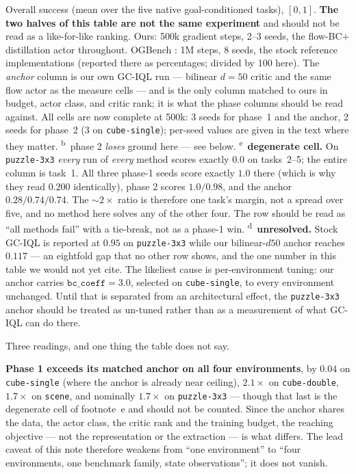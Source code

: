 \documentclass[10pt]{article}
\begin{document}
\begin{table}[h]
\vspace{3pt}
\raggedright\footnotesize
Overall success (mean over the five native goal-conditioned tasks), $[0,1]$.
\textbf{The two halves of this table are not the same experiment} and should not be read as
a like-for-like ranking.
Ours: 500k gradient steps, 2--3 seeds, the flow-BC$+$distillation actor throughout.
OGBench \citep{park2024ogbench}: 1M steps, 8 seeds, the stock reference implementations
(reported there as percentages; divided by 100 here).
The \emph{anchor} column is our own GC-IQL run --- bilinear $d{=}50$ critic and the same
flow actor as the measure cells --- and is the only column matched to ours in budget,
actor class, and critic rank; it is what the phase columns should be read against.
All cells are now complete at 500k: 3 seeds for phase~1 and the anchor, 2 seeds for
phase~2 (3 on \texttt{cube-single}); per-seed values are given in the text where they
matter.
\textsuperscript{b}~phase 2 \emph{loses} ground here --- see below.
\textsuperscript{e}~\textbf{degenerate cell.} On \texttt{puzzle-3x3} \emph{every} run of
\emph{every} method scores exactly $0.0$ on tasks~2--5; the entire column is task~1.
All three phase-1 seeds score exactly $1.0$ there (which is why they read $0.200$
identically), phase 2 scores $1.0/0.98$, and the anchor $0.28/0.74/0.74$. The
$\sim\!2\times$ ratio is therefore one task's margin, not a spread over five, and no
method here solves any of the other four. The row should be read as ``all methods fail''
with a tie-break, not as a phase-1 win.
\textsuperscript{d}~\textbf{unresolved.} Stock GC-IQL is reported at $0.95$ on
\texttt{puzzle-3x3} while our bilinear-$d50$ anchor reaches $0.117$ --- an eightfold gap
that no other row shows, and the one number in this table we would not yet cite. The
likeliest cause is per-environment tuning: our anchor carries $\texttt{bc\_coeff}{=}3.0$,
selected on \texttt{cube-single}, to every environment unchanged. Until that is separated
from an architectural effect, the \texttt{puzzle-3x3} anchor should be treated as
un-tuned rather than as a measurement of what GC-IQL can do there.
\label{tab:suite}
\end{table}

Three readings, and one thing the table does not say.

\textbf{Phase 1 exceeds its matched anchor on all four environments}, by $0.04$ on
\texttt{cube-single} (where the anchor is already near ceiling), $2.1\times$ on
\texttt{cube-double}, $1.7\times$ on \texttt{scene}, and nominally $1.7\times$ on
\texttt{puzzle-3x3} --- though that last is the degenerate cell of footnote~e and
should not be counted.
Since the anchor shares the data, the actor class, the critic rank and the training
budget, the reaching objective --- not the representation or the extraction --- is what
differs.
The lead caveat of this note therefore weakens from ``one environment'' to ``four
environments, one benchmark family, state observations''; it does not vanish.
\end{document}
